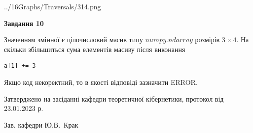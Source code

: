 \documentclass[12pt, ukrainian]{article}
\begin{document}
{\begin {large}
\begin{center}
	{../16Graphs/Traversals/314.png}
\end{center}\par
\newpage

{\begin {center}\textbf{Завдання 10}\end {center}}\par
Значенням змінної  є цілочисловий масив типу $numpy.ndarray$ розмірів $3{\times}4$. На скільки збільшиться сума елементів масиву  після виконання
\begin{verbatim}
a[1] += 3
\end{verbatim}


Якщо код некоректний, то в якості відповіді зазначити ERROR.\par
\newpage


\end {large}
}
{\smallskip \begin {small} Затверджено на засіданні кафедри теоретичної кібернетики, протокол  від   23.01.2023 р.\par\smallskip\smallskip
{\parbox {6.5 cm}{Зав. кафедри \dotfill Ю.В.~Крак}} \end{small}}
\end{document}

